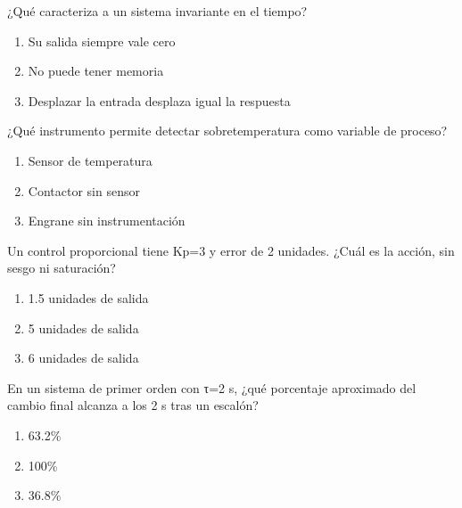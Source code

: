 \noindent\begin{minipage}{\linewidth}\setlength{\parskip}{4pt}\label{q:H-078}
¿Qué caracteriza a un sistema invariante en el tiempo?
\begin{enumerate}[label=\Alph*),nosep]
\item Su salida siempre vale cero
\item No puede tener memoria
\item Desplazar la entrada desplaza igual la respuesta
\end{enumerate}\end{minipage}\par\medskip

\noindent\begin{minipage}{\linewidth}\setlength{\parskip}{4pt}\label{q:H-079}
¿Qué instrumento permite detectar sobretemperatura como variable de proceso?
\begin{enumerate}[label=\Alph*),nosep]
\item Sensor de temperatura
\item Contactor sin sensor
\item Engrane sin instrumentación
\end{enumerate}\end{minipage}\par\medskip

\noindent\begin{minipage}{\linewidth}\setlength{\parskip}{4pt}\label{q:H-080}
Un control proporcional tiene Kp=3 y error de 2 unidades. ¿Cuál es la acción, sin sesgo ni saturación?
\begin{enumerate}[label=\Alph*),nosep]
\item 1.5 unidades de salida
\item 5 unidades de salida
\item 6 unidades de salida
\end{enumerate}\end{minipage}\par\medskip

\noindent\begin{minipage}{\linewidth}\setlength{\parskip}{4pt}\label{q:H-081}
En un sistema de primer orden con τ=2 s, ¿qué porcentaje aproximado del cambio final alcanza a los 2 s tras un escalón?
\begin{enumerate}[label=\Alph*),nosep]
\item 63.2\%
\item 100\%
\item 36.8\%
\end{enumerate}\end{minipage}\par\medskip

